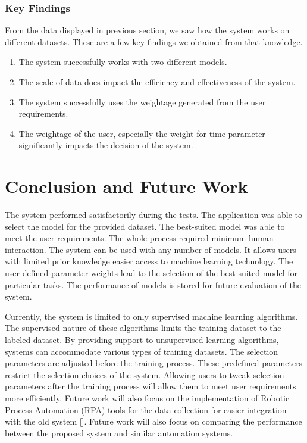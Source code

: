 \documentclass[a4paper,fleqn]{cas-dc}
\begin{document}
\subsubsection*{Key Findings}\label{subsubsec:key_findings}

From the data displayed in previous section, we saw how the system works on different datasets. These are a few key findings we obtained from that knowledge.
\begin{enumerate}
    \item The system successfully works with two different models.
    \item The scale of data does impact the efficiency and effectiveness of the system.
    \item The system successfully uses the weightage generated from the user requirements.
    \item The weightage of the user, especially the weight for time parameter significantly impacts the decision of the system.
\end{enumerate}

\section{Conclusion and Future Work}\label{sec:conclusion_and_futur_work}

The system performed satisfactorily during the tests. The application was able to select the model for the provided dataset. The best-suited model was able to meet the user requirements. The whole process required minimum human interaction. The system can be used with any number of models. It allows users with limited prior knowledge easier access to machine learning technology. The user-defined parameter weights lead to the selection of the best-suited model for particular tasks. The performance of models is stored for future evaluation of the system.

Currently, the system is limited to only supervised machine learning algorithms. The supervised nature of these algorithms limits the training dataset to the labeled dataset. By providing support to unsupervised learning algorithms, systems can accommodate various types of training datasets. The selection parameters are adjusted before the training process. These predefined parameters restrict the selection choices of the system. Allowing users to tweak selection parameters after the training process will allow them to meet user requirements more efficiently. Future work will also focus on the implementation of Robotic Process Automation (RPA) tools for the data collection for easier integration with the old system []. Future work will also focus on comparing the performance between the proposed system and similar automation systems.
\end{document}
